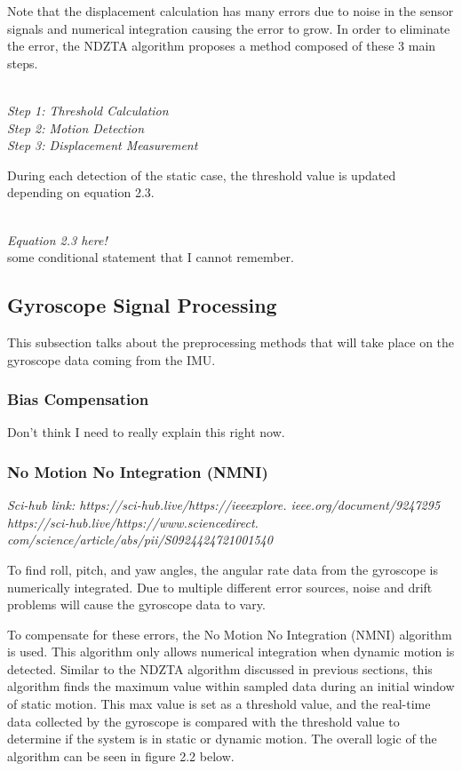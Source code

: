 Note that the displacement calculation has many errors due to noise in 
the sensor signals and numerical integration causing the error to grow. In 
order to eliminate the error, the NDZTA algorithm proposes a method composed
of these 3 main steps.

\emph{ \\ Step 1: Threshold Calculation \\
 Step 2: Motion Detection \\ 
 Step 3: Displacement Measurement \\ }

During each detection of the static case, the threshold value is updated 
depending on equation 2.3.

\emph{\\ Equation 2.3 here! \\}
some conditional statement that I cannot remember.

\subsection{Gyroscope Signal Processing}

This subsection talks about the preprocessing methods that will take place on
the gyroscope data coming from the IMU.

\subsubsection{Bias Compensation}

Don't think I need to really explain this right now.

\subsubsection{No Motion No Integration (NMNI)}

\emph{Sci-hub link: https://sci-hub.live/https://ieeexplore.
ieee.org/document/9247295 \\https://sci-hub.live/https://www.sciencedirect.
com/science/article/abs/pii/S0924424721001540 \\ }

To find roll, pitch, and yaw angles, the angular rate data from the gyroscope
is numerically integrated. Due to multiple different error sources, noise 
and drift problems will cause the gyroscope data to vary. 

To compensate for these errors, the No Motion No Integration (NMNI) algorithm 
is used. This algorithm only allows numerical integration when dynamic motion
is detected. Similar to the NDZTA algorithm discussed in previous sections, 
this algorithm finds the maximum value within sampled data during an initial 
window of static motion. This max value is set as a threshold value, and 
the real-time data collected by the gyroscope is compared with the threshold 
value to determine if the system is in static or dynamic motion. The overall 
logic of the algorithm can be seen in figure 2.2 below.

